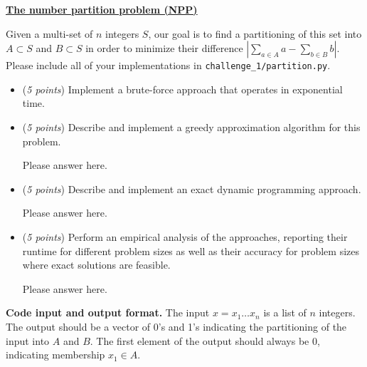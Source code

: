 \documentclass{hw_template}
\newcommand{\io}{\textbf{Code input and output format.} }
\begin{document}
\begin{challenge}
    \textbf{\href{https://en.wikipedia.org/wiki/Partition_problem}{The number partition problem (NPP)}}

    Given a multi-set of $n$ integers $S$,
    our goal is to find a partitioning of this set into $A\subset S$ and $B\subset S$
    in order to minimize their difference $|\sum_{a\in A}a - \sum_{b\in B}b|$.
    Please include all of your implementations in \texttt{challenge\_1/partition.py}.

    \begin{itemize}
        \item (\textit{5 points}) Implement a brute-force approach that operates in exponential time.

        \item (\textit{5 points}) Describe and implement a greedy approximation algorithm for this problem.
        
        \begin{solution}
        Please answer here.
        \end{solution}

        \item (\textit{5 points}) Describe and implement an exact dynamic programming approach.

        \begin{solution}
        Please answer here.
        \end{solution}

        \item(\textit{5 points}) Perform an empirical analysis of the approaches, reporting their runtime for different problem sizes as well as their accuracy for problem sizes where exact solutions are feasible.
    
        \begin{solution}
        Please answer here.
        \end{solution}

    \end{itemize}


    \io The input $x=x_1 \ldots x_n$ is a list of $n$ integers.
    The output should be a vector of 0's and 1's
    indicating the partitioning of the input into $A$ and $B$.
    The first element of the output should always be 0, indicating membership $x_1 \in A$.
\end{challenge}
\end{document}
